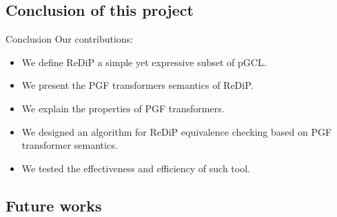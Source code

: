 \documentclass[8pt]{beamer}
\begin{document}
\subsection{Conclusion of this project}

\begin{frame}{Conclusion}
	Our contributions:
	\begin{itemize}
		\item We define ReDiP a simple yet expressive subset of pGCL.
		\item We present the PGF transformers semantics of ReDiP.
		\item We explain the properties of PGF transformers.
		\item We designed an algorithm for ReDiP equivalence checking based on PGF transformer semantics.
		\item We tested the effectiveness and efficiency of such tool.
	\end{itemize}
\end{frame}
\subsection{Future works}
\end{document}

